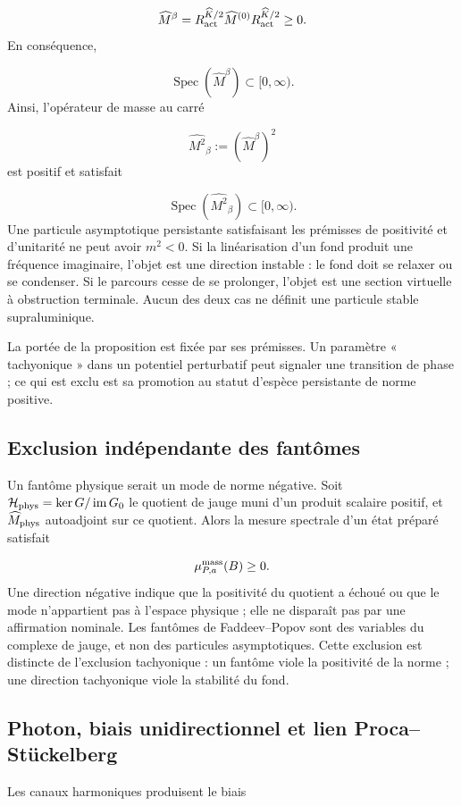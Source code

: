 \[
\widehat M^{\beta}
=R_{\rm act}^{\widehat K/2}
\widehat M^{(0)}
R_{\rm act}^{\widehat K/2}\ge0.
\]
En conséquence,

\[
\operatorname{Spec}(\widehat M^\beta)\subset[0,\infty).
\]
Ainsi, l'opérateur de masse au carré

\[
\widehat{M^2}_{\beta}:=(\widehat M^\beta)^2
\]
est positif et satisfait

\[
\operatorname{Spec}(\widehat{M^2}_{\beta})\subset[0,\infty).
\]
Une particule asymptotique persistante satisfaisant les prémisses de positivité et d'unitarité ne peut avoir \(m^2<0\). Si la linéarisation d'un fond produit une fréquence imaginaire, l'objet est une direction instable : le fond doit se relaxer ou se condenser. Si le parcours cesse de se prolonger, l'objet est une section virtuelle à obstruction terminale. Aucun des deux cas ne définit une particule stable supraluminique.

La portée de la proposition est fixée par ses prémisses. Un paramètre « tachyonique » dans un potentiel perturbatif peut signaler une transition de phase ; ce qui est exclu est sa promotion au statut d'espèce persistante de norme positive.

\subsection{Exclusion indépendante des fantômes}
Un fantôme physique serait un mode de norme négative. Soit \(\mathcal H_{\rm phys}=\ker G/\operatorname{im}G_0\) le quotient de jauge muni d'un produit scalaire positif, et \(\widehat M_{\rm phys}\) autoadjoint sur ce quotient. Alors la mesure spectrale d'un état préparé satisfait

\[
\mu_{P,a}^{\rm mass}(B)\ge0.
\]
Une direction négative indique que la positivité du quotient a échoué ou que le mode n'appartient pas à l'espace physique ; elle ne disparaît pas par une affirmation nominale. Les fantômes de Faddeev--Popov sont des variables du complexe de jauge, et non des particules asymptotiques. Cette exclusion est distincte de l'exclusion tachyonique : un fantôme viole la positivité de la norme ; une direction tachyonique viole la stabilité du fond.

\subsection{Photon, biais unidirectionnel et lien Proca--Stückelberg}
Les canaux harmoniques produisent le biais

